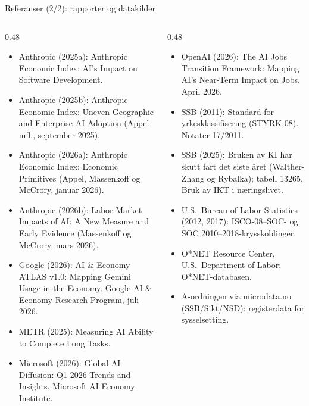 \begin{frame}{Referanser (2/2): rapporter og datakilder}
\scriptsize
\begin{columns}[T,onlytextwidth]
\begin{column}{0.48\textwidth}
\begin{itemize}\setlength{\itemsep}{2pt}
  \item Anthropic (2025a): Anthropic Economic Index: AI's Impact on Software Development.
  \item Anthropic (2025b): Anthropic Economic Index: Uneven Geographic and Enterprise AI Adoption (Appel mfl., september 2025).
  \item Anthropic (2026a): Anthropic Economic Index: Economic Primitives (Appel, Massenkoff og McCrory, januar 2026).
  \item Anthropic (2026b): Labor Market Impacts of AI: A New Measure and Early Evidence (Massenkoff og McCrory, mars 2026).
  \item Google (2026): AI \& Economy ATLAS v1.0: Mapping Gemini Usage in the Economy. Google AI \& Economy Research Program, juli 2026.
  \item METR (2025): Measuring AI Ability to Complete Long Tasks.
  \item Microsoft (2026): Global AI Diffusion: Q1 2026 Trends and Insights. Microsoft AI Economy Institute.
\end{itemize}
\end{column}
\begin{column}{0.48\textwidth}
\begin{itemize}\setlength{\itemsep}{2pt}
  \item OpenAI (2026): The AI Jobs Transition Framework: Mapping AI's Near-Term Impact on Jobs. April 2026.
  \item SSB (2011): Standard for yrkesklassifisering (STYRK-08). Notater 17/2011.
  \item SSB (2025): Bruken av KI har skutt fart det siste året (Walther-Zhang og Rybalka); tabell 13265, Bruk av IKT i næringslivet.
  \item U.S.\ Bureau of Labor Statistics (2012, 2017): ISCO-08--SOC- og SOC 2010--2018-krysskoblinger.
  \item O*NET Resource Center, U.S.\ Department of Labor: O*NET-databasen.
  \item A-ordningen via microdata.no (SSB/Sikt/NSD): registerdata for sysselsetting.
\end{itemize}
\end{column}
\end{columns}
\end{frame}
